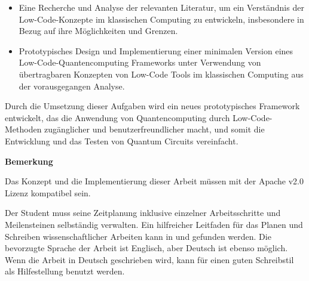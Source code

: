 \begin{itemize}
\item
  Eine Recherche und Analyse der relevanten Literatur, um ein
  Verständnis der Low-Code-Konzepte im klassischen Computing zu
  entwickeln, insbesondere in Bezug auf ihre Möglichkeiten und Grenzen.
\item
  Prototypisches Design und Implementierung einer minimalen Version
  eines Low-Code-Quantencomputing Frameworks unter Verwendung von
  übertragbaren Konzepten von Low-Code Tools im klassischen Computing
  aus der vorausgegangen Analyse.
\end{itemize}

Durch die Umsetzung dieser Aufgaben wird ein neues prototypisches
Framework entwickelt, das die Anwendung von Quantencomputing durch
Low-Code-Methoden zugänglicher und benutzerfreundlicher macht, und somit
die Entwicklung und das Testen von Quantum Circuits vereinfacht.

\textbf{Bemerkung}

Das Konzept und die Implementierung dieser Arbeit müssen mit der Apache
v2.0 Lizenz kompatibel sein.

Der Student muss seine Zeitplanung inklusive einzelner Arbeitsschritte
und Meilensteinen selbständig verwalten. Ein hilfreicher Leitfaden für
das Planen und Schreiben wissenschaftlicher Arbeiten kann in \cite{Deininger200X} und
\cite{Zobel2004} gefunden werden. Die bevorzugte Sprache der Arbeit ist Englisch,
aber Deutsch ist ebenso möglich. Wenn die Arbeit in Deutsch geschrieben
wird, kann \cite{Rechenberg2006} für einen guten Schreibstil als Hilfestellung benutzt
werden.